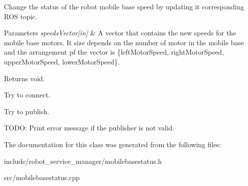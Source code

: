 Change the status of the robot mobile base speed by updating it corresponding R\+OS topic. 


\begin{DoxyParams}{Parameters}
{\em speeds\+Vector\mbox{[}in\mbox{]}} & A vector that contains the new speeds for the mobile base motors. It size depends on the number of motor in the mobile base and the arrangement pf the vector is \{left\+Motor\+Speed, right\+Motor\+Speed, upper\+Motor\+Speed, lower\+Motor\+Speed\}. \\
\hline
\end{DoxyParams}
\begin{DoxyReturn}{Returns}
void. 
\end{DoxyReturn}
Try to connect.

Try to publish.

T\+O\+DO\+: Print error message if the publisher is not valid.

The documentation for this class was generated from the following files\+:\begin{DoxyCompactItemize}
\item 
include/robot\+\_\+service\+\_\+manager/mobilebasestatus.\+h\item 
src/mobilebasestatus.\+cpp\end{DoxyCompactItemize}
